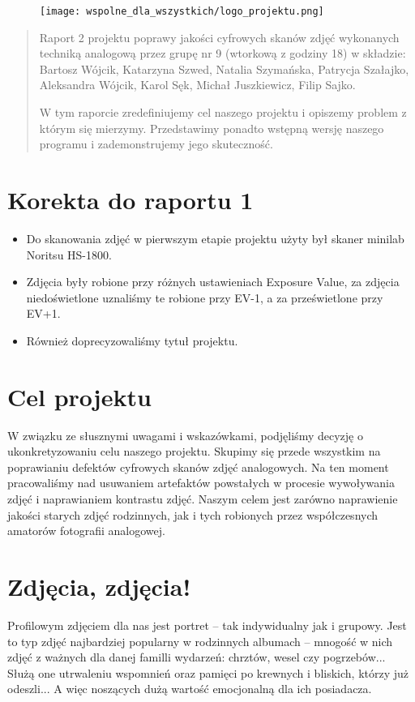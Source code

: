 \documentclass[]{mwart}
\begin{document}
\begin{figure}[h]
    \centering
    \texttt{[image: wspolne\_dla\_wszystkich/logo\_projektu.png]}
\end{figure}

\vfill
\begin{abstract}
    Raport 2 projektu poprawy jakości cyfrowych skanów zdjęć wykonanych techniką analogową przez grupę nr 9 (wtorkową z godziny 18)
    w składzie:  Bartosz Wójcik, Katarzyna Szwed, Natalia Szymańska,
    Patrycja Szałajko, Aleksandra Wójcik, Karol Sęk, Michał Juszkiewicz, Filip Sajko.

    W tym raporcie zredefiniujemy cel naszego projektu i opiszemy problem z którym się mierzymy.
    Przedstawimy ponadto wstępną wersję naszego programu i zademonstrujemy jego skuteczność.
\end{abstract}


\newpage

\section{Korekta do raportu 1}
\begin{itemize}
    \item Do skanowania zdjęć w pierwszym etapie projektu użyty był skaner minilab Noritsu HS-1800.
    \item Zdjęcia były robione przy różnych ustawieniach Exposure Value, za zdjęcia niedoświetlone uznaliśmy te robione przy EV-1, a za prześwietlone przy EV+1.
    \item Również doprecyzowaliśmy tytuł projektu.
\end{itemize}


\section{Cel projektu}
W związku ze słusznymi uwagami i wskazówkami, podjęliśmy decyzję o ukonkretyzowaniu celu naszego projektu.
Skupimy się przede wszystkim na poprawianiu defektów cyfrowych skanów zdjęć analogowych.
Na ten moment pracowaliśmy nad usuwaniem artefaktów powstałych w procesie wywoływania zdjęć i naprawianiem kontrastu zdjęć.
Naszym celem jest zarówno naprawienie jakości starych zdjęć rodzinnych,
jak i tych robionych przez współczesnych amatorów fotografii analogowej.

\section{Zdjęcia, zdjęcia!}
Profilowym zdjęciem dla nas jest portret -- tak indywidualny jak i grupowy.
Jest to typ zdjęć najbardziej popularny w rodzinnych albumach -- mnogość w nich zdjęć z ważnych
dla danej familli wydarzeń: chrztów, wesel czy pogrzebów... Służą one utrwaleniu wspomnień oraz pamięci
po krewnych i bliskich, którzy już odeszli... A więc noszących dużą wartość emocjonalną dla ich posiadacza.
\end{document}
